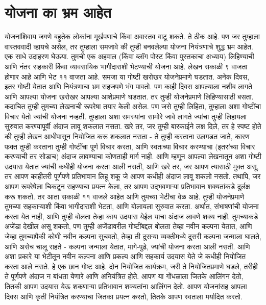 \chapter{योजना का भ्रम आहेत}
योजनांशिवाय जगणे बहुतेक लोकांना मूर्खपणाचे किंवा अवास्तव वाटू शकते. ते ठीक आहे. पण जर तुम्हाला वास्तववादी व्हायचे असेल, तर तुम्हाला समजावे की तुम्ही बनवलेल्या योजना नियंत्रणाचे शुद्ध भ्रम आहेत.
एक साधे उदाहरण घेऊया. तुमची एक अहवाल (किंवा ब्लॉग पोस्ट किंवा पुस्तकाचा अध्याय) लिहिण्याची आणि नंतर सहकारी किंवा व्यावसायिक भागीदाराशी भेटण्याची योजना आहे. लेखन सकाळी ९ वाजता होणार आहे आणि भेट ११ वाजता आहे.
समजा या गोष्टी खरोखर योजनेप्रमाणे घडतात. अनेक दिवस, इतर गोष्टी येतात आणि नियंत्रणाचा भ्रम सहजपणे भंग पावतो. पण काही दिवस आपल्याला नशीब लागते आणि आपल्या योजना खरोखर आपल्या आशेप्रमाणे घडतात.
तर तुम्ही योजनेप्रमाणे लिहिण्यासाठी बसता. कदाचित तुम्ही तुमच्या लेखनाची रूपरेषा तयार केली असेल. पण जसे तुम्ही लिहिता, तुम्हाला अशा गोष्टींचा विचार येतो ज्यांची योजना नव्हती. तुम्हाला अशा समस्यांना सामोरे जावे लागते ज्यांचा तुम्ही लिहायला सुरुवात करण्यापूर्वी अंदाज लावू शकलात नसता. खरे तर, जर तुम्ही बारकाईने लक्ष दिले, तर हे स्पष्ट होते की तुम्ही लेखन आधीपासून नियोजित करू शकलात नसता - ते तुम्ही करताना उलगडत जाते, कारण फक्त तुम्ही करताना तुम्ही गोष्टींचा पूर्ण विचार करता, आणि स्वतःच्या विचार करण्याचा (इतरांच्या विचार करण्याची तर सोडाच) अंदाज लावण्याचा कोणताही मार्ग नाही.
आणि म्हणून आपल्या लेखनातून अशा गोष्टी उदयास येतात ज्यांची कधीही योजना करता आली नसती, आणि खरे तर, जर आपण त्यासाठी मुक्त असू, तर आपण काहीतरी पूर्णपणे प्रतिभावान लिहू शकू जे आपण कधीही अंदाज लावू शकलो नसतो. तथापि, जर आपण रूपरेषेला चिकटून राहण्याचा प्रयत्न केला, तर आपण उद्भवणाऱ्या प्रतिभावान शक्यतांकडे दुर्लक्ष करू शकतो.
तर आता सकाळी ११ वाजले आहेत आणि तुमच्या भेटीचा वेळ आहे. तुम्ही योजनेप्रमाणे तुमच्या सहकाऱ्याशी किंवा भागीदाराशी भेटता, आणि बोलायला सुरुवात करता. अर्थात, संभाषणांची योजना करता येत नाही, आणि तुम्ही बोलता तेव्हा काय उदयास येईल याचा अंदाज लावणे शक्य नाही. तुमच्याकडे अजेंडा देखील असू शकतो, पण तुम्ही अजेंडावरील गोष्टींबद्दल बोलता तेव्हा नवीन कल्पना येतात, आणि जेव्हा तुमच्यापैकी कोणी नवीन कल्पना सुचवतो, तेव्हा ती दुसऱ्या व्यक्तीमध्ये दुसरी कल्पना जन्माला घालते, आणि असेच चालू राहते - कल्पना जन्माला येतात, मागे-पुढे, ज्यांची योजना करता आली नसती.
आणि अशा प्रकारे या भेटीतून नवीन कल्पना आणि प्रकल्प आणि सहकार्य उदयास येते जे कधीही नियोजित करता आले नसते. हे एक छान गोष्ट आहे.
दोन नियोजित कार्यक्रम, जरी ते नियोजितप्रमाणे घडले, तरीही ते पूर्णपणे अंदाज न बांधता येणारे आणि अनियंत्रित होते. आपण या गोंधळाला जितके आलिंगन देतो, तितकी आपण उदयास येऊ शकणाऱ्या प्रतिभावान शक्यतांना आलिंगन देतो. आपण योजनांसह आपला दिवस आणि कृती नियंत्रित करण्याचा जितका प्रयत्न करतो, तितके आपण स्वतःला मर्यादित करतो.

